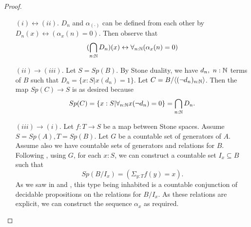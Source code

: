 \begin{proof}
\item 
  \begin{itemize}
  \item[$(i)\leftrightarrow (ii)$.] 
    $D_n$ and $\alpha_{(\cdot)}$ can be defined from each other by 
     $D_n(x) \leftrightarrow (\alpha_x(n) = 0)$. Then observe that %
     \begin{equation}
      (\bigcap_{n:\mathbb{N}} D_n) (x) \leftrightarrow 
      \forall_{n:\mathbb N} (\alpha_x(n) = 0) 
     \end{equation}
   \item[$(ii) \to (iii)$.]
      Let $S=Sp(B)$. 
      By Stone duality, we have $d_n,~n:\mathbb{N}$ terms of $B$ such that $D_n = \{x:S| x(d_n) = 1\}$. 
      Let $C = B/\langle (\neg d_n)_{n:\mathbb{N}}\rangle$.
      Then the map $Sp(C) \to S$ is as desired because
      $$Sp(C) = \{x:S| \forall_{n:\mathbb{N}} x(\neg d_n) =0\}  = \bigcap_{n:\mathbb{N}} D_n.$$
   \item[$(iii) \to (i)$.] 
      Let $f:T\to S$ be a map between Stone spaces. 
      Assume $S = Sp(A), T = Sp (B)$. 
%
      Let $G$ be a countable set of generators of $A$. 
      Assume also we have countable sets of generators and relations for $B$. 
%
      Following , using $G$, for each $x:S$, we can construct 
      a countable set $I_x\subseteq B$ such that $$Sp(B/I_x) = (\Sigma_{y:T} f(y) = x) .$$
      As we saw in  and , 
      this type being inhabited is a countable conjunction 
      of decidable propositions on the relations for $B/I_x$. 
      As these relations are explicit, we can construct the sequence $\alpha_x$ as required. 


\end{itemize}
\end{proof}
